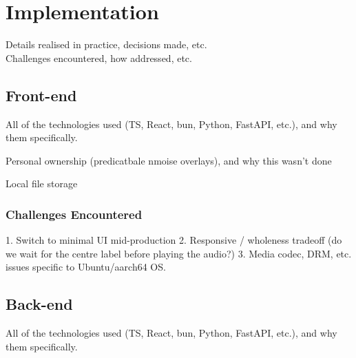     
    \section{Implementation}
        \begin{temp}
            Details realised in practice, decisions made, etc.\\
            Challenges encountered, how addressed, etc.
        \end{temp}
    
        \subsection{Front-end}
    
            \begin{temp}
                All of the technologies used (TS, React, bun, Python, FastAPI, etc.), and why them specifically.
    
                Personal ownership (predicatbale nmoise overlays), and why this wasn't done
    
                Local file storage
            \end{temp}
        
            \subsubsection{Challenges Encountered}
                \begin{temp}
                    1. Switch to minimal UI mid-production
                    2. Responsive / wholeness tradeoff (do we wait for the centre label before playing the audio?)
                    3. Media codec, DRM, etc. issues specific to Ubuntu/aarch64 OS.
                \end{temp}
    
        \subsection{Back-end} %
    
            \begin{temp}
                All of the technologies used (TS, React, bun, Python, FastAPI, etc.), and why them specifically.
            \end{temp}
    
